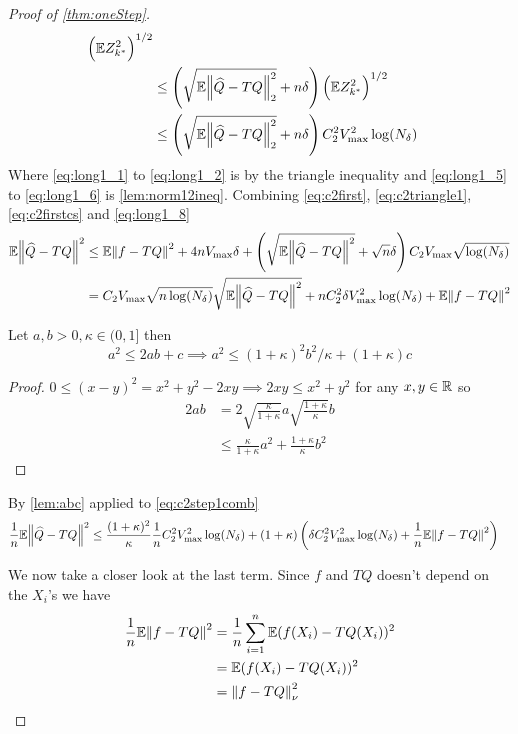 \begin{proof}[Proof of \cref{thm:oneStep}]
\begin{align}
    \left( \mathbb{E} Z_{k^*}^2 \right)^{1/2} 
    \label{eq:long1_5}
    \\ &\leq 
    \left(\sqrt{ \mathbb{E} \norm{\widehat{Q} -TQ}_2^2 } + n \delta \right) 
    \left( \mathbb{E} Z_{k^*}^2 \right)^{1/2} 
    \label{eq:long1_6}
    \\ &\leq \left(\sqrt{\mathbb{E} \norm{\widehat{Q} -TQ}_2^2} + n \delta \right)
    C_2^2 V_{\max}^2 \log(N_\delta)
    \label{eq:long1_8}
  \end{align}
  Where \cref{eq:long1_1} to \cref{eq:long1_2} is by the triangle inequality
  and \cref{eq:long1_5} to \cref{eq:long1_6} is \cref{lem:norm12ineq}.
  Combining \cref{eq:c2first}, \cref{eq:c2triangle1},
  \cref{eq:c2firstcs} and \cref{eq:long1_8}
  \begin{align}
    \mathbb{E} \norm{\widehat{Q} - TQ}^2 & \leq \mathbb{E} \norm{f - TQ}^2 + 4 n V_{\max} \delta
    + \left( \sqrt{\mathbb{E} \norm{\widehat{Q} - TQ}^2} + \sqrt{n} \delta \right)
    C_2 V_{\max} \sqrt{\log(N_\delta)}
    \\ & = C_2 V_{\max} \sqrt{n \log(N_\delta)} \sqrt{\mathbb{E} \norm{\widehat{Q} - TQ}^2}
    + n C_2^2 \delta V_{\max}^2 \log(N_\delta) + \mathbb{E} \norm{f - TQ}^2
    \label{eq:c2step1comb}
  \end{align}
  \begin{lem} Let $a,b>0, \kappa \in (0,1]$ then
    \[ a^2 \leq 2ab + c \implies a^2 \leq (1 + \kappa)^2 b^2 / \kappa
    + (1 + \kappa) c \]
    \label{lem:abc}
  \end{lem}
  \begin{proof} $0 \leq (x - y)^2 = x^2 + y^2 - 2xy \implies 2xy \leq x^2 + y^2$
    for any $x, y \in \mathbb{R}$ so
    \begin{align*}
      2ab & = 2 \sqrt{\frac{\kappa}{1+\kappa}} a \sqrt{\frac{1+\kappa}{\kappa}} b
      \\ & \leq \frac{\kappa}{1+\kappa} a^2 + \frac{1 + \kappa}{\kappa} b^2
    \end{align*}
  \end{proof}
  By \cref{lem:abc} applied to \cref{eq:c2step1comb}
  \begin{align}
    \frac{1}{n} \mathbb{E} \norm{\widehat{Q} - TQ}^2
    & \leq \frac{(1+\kappa)^2}{\kappa} \frac{1}{n} C_2^2 V_{\max}^2 \log(N_\delta)
    + (1 + \kappa) \left( \delta C_2^2 V_{\max}^2 \log(N_\delta)
    + \frac{1}{n} \mathbb{E} \norm{f - TQ}^2 \right)
    \label{eq:c2step1final0}
  \end{align}

  We now take a closer look at the last term. Since $f$ and $TQ$ doesn't
  depend on the $X_i$'s we have
  \begin{align*}
    \frac{1}{n} \mathbb{E} \norm{f- TQ}^2
    = & \; \frac{1}{n} \sum_{i=1}^n \mathbb{E} (f(X_i) - TQ(X_i))^2
    \\ = & \; \mathbb{E} (f(X_i) - TQ(X_i))^2
    \\ = & \; \norm{f - TQ}^2_\nu
  \end{align*}


\end{proof}

